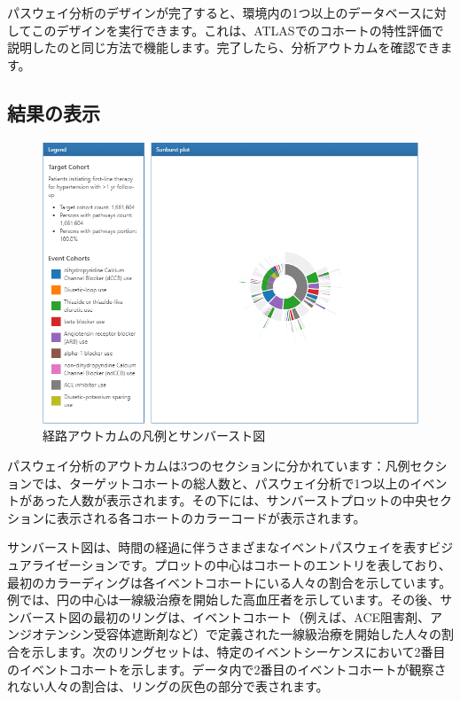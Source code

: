 \documentclass[
  11pt]{book}
\theoremstyle{definition}
\theoremstyle{definition}
\theoremstyle{definition}
\theoremstyle{definition}
\theoremstyle{remark}
\begin{document}
パスウェイ分析のデザインが完了すると、環境内の1つ以上のデータベースに対してこのデザインを実行できます。これは、ATLASでのコホートの特性評価で説明したのと同じ方法で機能します。完了したら、分析アウトカムを確認できます。

\subsection{結果の表示}\label{ux7d50ux679cux306eux8868ux793a}

\begin{figure}

{\centering \includegraphics[width=1\linewidth]{images/Characterization/atlasPathwaysResults} 

}

\caption{経路アウトカムの凡例とサンバースト図}\label{fig:atlasPathwaysResults}
\end{figure}

パスウェイ分析のアウトカムは3つのセクションに分かれています：凡例セクションでは、ターゲットコホートの総人数と、パスウェイ分析で1つ以上のイベントがあった人数が表示されます。その下には、サンバーストプロットの中央セクションに表示される各コホートのカラーコードが表示されます。

サンバースト図は、時間の経過に伴うさまざまなイベントパスウェイを表すビジュアライゼーションです。プロットの中心はコホートのエントリを表しており、最初のカラーディングは各イベントコホートにいる人々の割合を示しています。例では、円の中心は一線級治療を開始した高血圧者を示しています。その後、サンバースト図の最初のリングは、イベントコホート（例えば、ACE阻害剤、アンジオテンシン受容体遮断剤など）で定義された一線級治療を開始した人々の割合を示します。次のリングセットは、特定のイベントシーケンスにおいて2番目のイベントコホートを示します。データ内で2番目のイベントコホートが観察されない人々の割合は、リングの灰色の部分で表されます。
\end{document}
